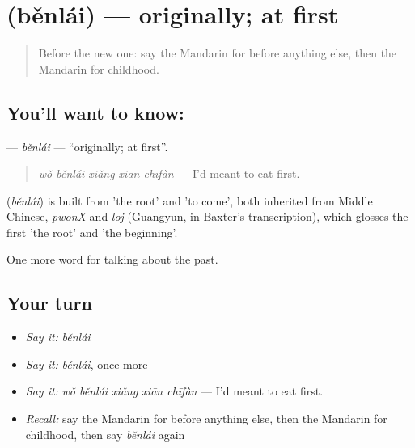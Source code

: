 \section[\texorpdfstring{\zh{本来} (běnlái)}{本来 (běnlái)}]{ (běnlái) — originally; at first}

\label{lesson:ZH-C269-benlai}



\begin{quote}
Before the new one: say the Mandarin for before anything else, then the Mandarin for childhood.
\end{quote}

\subsection*{You'll want to know: }
\textbf{} — \emph{běnlái} — \textquotedblleft{}originally; at first\textquotedblright{}.

\begin{quote}
\textbf{} \emph{wǒ běnlái xiǎng xiān chīfàn} — I'd meant to eat first.
\end{quote}

\begin{cousinweb}
\textbf{} (\emph{běnlái}) is built from  'the root' and  'to come', both inherited from Middle Chinese, \emph{pwonX} and \emph{loj} (Guangyun, in Baxter's transcription), which glosses the first 'the root' and 'the beginning'.
\end{cousinweb}

\begin{grammarlens}[title={What you've built}]
One more word for talking about the past.
\end{grammarlens}

\subsection*{Your turn}
\begin{itemize}
\raggedright
  \item \emph{Say it:} \emph{běnlái}
  \item \emph{Say it:} \emph{běnlái}, once more
  \item \emph{Say it:} \emph{wǒ běnlái xiǎng xiān chīfàn} — I'd meant to eat first.
  \item \emph{Recall:} say the Mandarin for before anything else, then the Mandarin for childhood, then say \emph{běnlái} again
\end{itemize}

